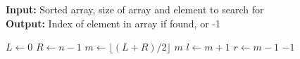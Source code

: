\documentclass[12pt,a4paper]{article}
\begin{document}
	\begin{algorithm}
		\textbf{Input:} Sorted array, size of array and element to search for
		\\
		\textbf{Output:} Index of element in array if found, or -1
		\begin{algorithmic}
				\State $ L \gets 0 $
				\State $ R \gets n-1 $
					\State $ m \gets \lfloor (L + R)/2 \rfloor $
						\Return $ m $
						\State $ l \gets m + 1 $
					\Else
						\State $ r \gets m - 1 $
					\EndIf
				\EndWhile
				\Return $ -1 $
			\EndProcedure
		\end{algorithmic}
	\end{algorithm}
\end{document}
